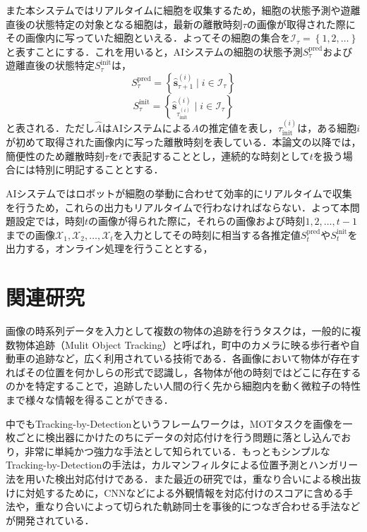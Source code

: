 また本システムではリアルタイムに細胞を収集するため，細胞の状態予測や遊離直後の状態特定の対象となる細胞は，最新の離散時刻$\tau$の画像が取得された際にその画像内に写っていた細胞といえる．よってその細胞の集合を$\mathcal{I}_\tau = \left\{1, 2, \dots\right\}$と表すことにする．これを用いると，AIシステムの細胞の状態予測$S^{\text{pred}}_{\tau}$および遊離直後の状態特定$S^{\text{init}}_{\tau}$は，
\begin{equation}
    \label{eq:cell_state_prediction}
    S^{\text{pred}}_{\tau} = \left\{\hat{\bm{s}}_{\tau + 1}^{(i)} \mid i \in \mathcal{I}_{\tau}\right\}
\end{equation}
\begin{equation}
    \label{eq:cell_initial_state_prediction}
    S^{\text{init}}_{\tau} = \left\{\hat{\bm{s}}_{\tau_{\text{init}}^{(i)}}^{(i)} \mid i \in \mathcal{I}_{\tau}\right\}
\end{equation}
と表される．ただし$\hat{A}$はAIシステムによる$A$の推定値を表し，$\tau_{\text{init}}^{(i)}$は，ある細胞$i$が初めて取得された画像内に写った離散時刻を表している．本論文の以降では，簡便性のため離散時刻$\tau$を$t$で表記することとし，連続的な時刻として$t$を扱う場合には特別に明記することとする．

AIシステムではロボットが細胞の挙動に合わせて効率的にリアルタイムで収集を行うため，これらの出力もリアルタイムで行わなければならない．よって本問題設定では，時刻$t$の画像が得られた際に，それらの画像および時刻$1,2,\dots, t-1$までの画像$\mathcal{X}_1, \mathcal{X}_2, \dots, \mathcal{X}_t$を入力としてその時刻に相当する各推定値$S_t^{\text{pred}}$や$S_t^{\text{init}}$を出力する，オンライン処理を行うこととする，

\section{関連研究}
\label{sec:related_works}

画像の時系列データを入力として複数の物体の追跡を行うタスクは，一般的に複数物体追跡（Mulit Object Tracking）\cite{luo2021multiple}と呼ばれ，町中のカメラに映る歩行者や自動車の追跡など，広く利用されている技術である．各画像において物体が存在すればその位置を何かしらの形式で認識し，各物体が他の時刻ではどこに存在するのかを特定することで，追跡したい人間の行く先から細胞内を動く微粒子の特性まで様々な情報を得ることができる．

中でもTracking-by-Detectionというフレームワークは，MOTタスクを画像を一枚ごとに検出器にかけたのちにデータの対応付けを行う問題に落とし込んでおり，非常に単純かつ強力な手法として知られている．もっともシンプルなTracking-by-Detectionの手法は，カルマンフィルタによる位置予測とハンガリー法を用いた検出対応付けである．また最近の研究では，重なり合いによる検出抜けに対処するために，CNNなどによる外観情報を対応付けのスコアに含める手法や，重なり合いによって切られた軌跡同士を事後的につなぎ合わせる手法などが開発されている．

